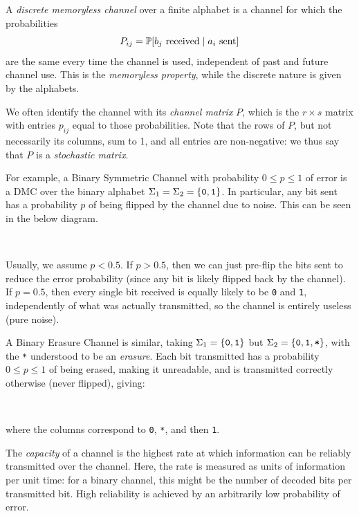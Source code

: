 \documentclass{article}
\begin{document}
\begin{definition}
	\label{discrete-memoryless-channel}
    A \textit{discrete memoryless channel} over a finite alphabet
    is a channel for which the probabilities
	\[
	P_{ij} = \P[b_j \text{ received} \mid a_i \text{ sent}]
	\]
	are the same every time the channel is used,
	independent of past and future channel use.
	This is the \textit{memoryless property},
	while the discrete nature is given by the alphabets.
\end{definition}

We often identify the channel with its \textit{channel matrix} $P$,
which is the $r \times s$ matrix
with entries $p_{ij}$ equal to those probabilities.
Note that the rows of $P$, but not necessarily its columns, sum to 1,
and all entries are non-negative:
we thus say that $P$ is a \textit{stochastic matrix}.

\begin{example}
	\label{binary-symmetric-erasure-channel}
	For example, a Binary Symmetric Channel
	with probability $0 \leq p \leq 1$ of error
	is a DMC over the binary alphabet $\Sigma_1 = \Sigma_2 = \binset$.
	In particular, any bit sent has a probability $p$
	of being flipped by the channel due to noise.
	This can be seen in the below diagram.

	\  \

	Usually, we assume $p < 0.5$.
	If $p > 0.5$,
	then we can just pre-flip the bits sent to reduce the error probability
	(since any bit is likely flipped back by the channel).
	If $p = 0.5$,
	then every single bit received is equally likely to be \texttt{0} and \texttt{1},
	independently of what was actually transmitted,
	so the channel is entirely useless (pure noise).

	A Binary Erasure Channel is similar,
	taking $\Sigma_1 = \binset$ but
	$\Sigma_2 = \set{\texttt{0}, \texttt{1}, \texttt{*}}$,
	with the \texttt{*} understood to be an \textit{erasure}.
	Each bit transmitted has a probability $0 \leq p \leq 1$ of being erased,
	making it unreadable,
	and is transmitted correctly otherwise (never flipped), giving:

	\  \

	where the columns correspond to \texttt{0}, \texttt{*}, and then \texttt{1}.
\end{example}

\begin{definition}[Capacity]
	\label{capacity-definition-heuristic}
    The \textit{capacity} of a channel is
    the highest rate at which information
    can be reliably transmitted over the channel.
    Here, the rate is measured as units of information per unit time:
    for a binary channel, this might be
    the number of decoded bits per transmitted bit.
    High reliability is achieved by
    an arbitrarily low probability of error.
\end{definition}
\end{document}
